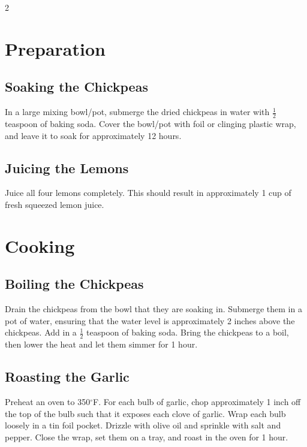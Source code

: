 \documentclass[10pt]{article}
\begin{document}
    \begin{multicols}{2}

    \section{Preparation}

        \subsection{Soaking the Chickpeas}

            In a large mixing bowl/pot, submerge the dried chickpeas in water with $\frac{1}{2}$ teaspoon of baking soda. Cover the bowl/pot with foil or clinging plastic wrap, and leave it to soak for approximately 12 hours.

        \subsection{Juicing the Lemons}

            Juice all four lemons completely. This should result in approximately 1 cup of fresh squeezed lemon juice.

    \section{Cooking}

        \subsection{Boiling the Chickpeas}

            Drain the chickpeas from the bowl that they are soaking in. Submerge them in a pot of water, ensuring that the water level is approximately 2 inches above the chickpeas. Add in a $\frac{1}{2}$ teaspoon of baking soda. Bring the chickpeas to a boil, then lower the heat and let them simmer for 1 hour.

        \subsection{Roasting the Garlic}

            Preheat an oven to 350$^\circ$F. For each bulb of garlic, chop approximately 1 inch off the top of the bulb such that it exposes each clove of garlic. Wrap each bulb loosely in a tin foil pocket. Drizzle with olive oil and sprinkle with salt and pepper. Close the wrap, set them on a tray, and roast in the oven for 1 hour.


\end{multicols}
\end{document}
